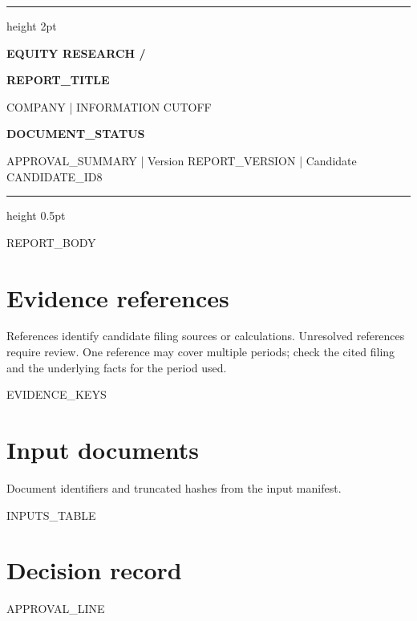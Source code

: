 \documentclass[11pt,a4paper]{article}
\begin{document}
\justifying
\setlength{\parindent}{0pt}
\vspace*{2mm}
{\color{accent}\hrule height 2pt}
\vspace{7mm}
{\sffamily\small\bfseries\color{accent} EQUITY RESEARCH \quad / }\par
\vspace{3mm}
{\fontsize{25}{30}\selectfont\bfseries {{REPORT_TITLE}}}\par
\vspace{4mm}
{\sffamily\small\color{muted} {{COMPANY}} \quad | \quad INFORMATION CUTOFF }\par
\vspace{4mm}
{\sffamily\small\bfseries\color{amber} {{DOCUMENT_STATUS}}}\par
{\sffamily\footnotesize\color{muted} {{APPROVAL_SUMMARY}} \quad | \quad Version {{REPORT_VERSION}} \quad | \quad Candidate {{CANDIDATE_ID8}}}\par
\vspace{2mm}
{\color{line}\hrule height 0.5pt}
\vspace{1mm}
\fontsize{11}{15.2}\selectfont
{{REPORT_BODY}}
\clearpage
\section*{Evidence references}
{\sffamily\small\color{muted} References identify candidate filing sources or calculations. Unresolved references require review. One reference may cover multiple periods; check the cited filing and the underlying facts for the period used.}\par
\small\setlength{\parskip}{7pt}
{{EVIDENCE_KEYS}}
\section*{Input documents}
{\sffamily\small\color{muted} Document identifiers and truncated hashes from the input manifest.}\par
{\sffamily\small {{INPUTS_TABLE}}}
\section*{Decision record}
{{APPROVAL_LINE}}
\end{document}
